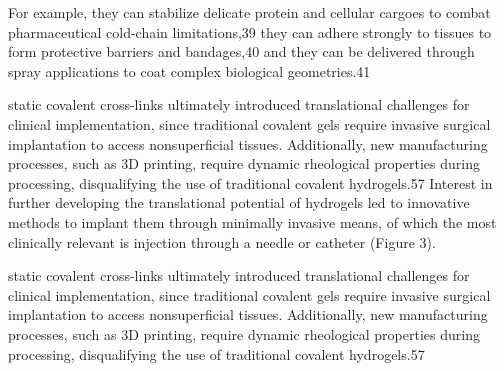 For example, they can stabilize delicate protein and cellular cargoes to combat pharmaceutical  cold-chain limitations,39 they can adhere strongly to tissues to  form protective barriers and bandages,40 and they can be delivered through spray applications to coat complex biological  geometries.41

static covalent cross-links ultimately introduced translational challenges for clinical implementation, since traditional covalent gels require invasive surgical implantation to access nonsuperficial tissues.  
Additionally, new manufacturing processes, such as 3D printing, require dynamic rheological properties during processing, disqualifying the use of traditional covalent  hydrogels.57  
Interest in further developing the translational potential of hydrogels led to innovative methods to implant them through minimally invasive means, of which the most clinically relevant is injection through a needle or catheter (Figure 3).

static covalent cross-links ultimately introduced translational challenges for clinical implementation, since traditional covalent gels require invasive surgical implantation to access nonsuperficial tissues.  
Additionally, new manufacturing processes, such as 3D printing, require dynamic rheological properties during processing, disqualifying the use of traditional covalent  hydrogels.57

\begin{comment}
These include one-step procedures like polymerization and parallel cross-linking of multifunctional monomers, as well as multiple step procedures involving synthesis of polymer molecules having reactive groups and their subsequent cross-linking, possibly also by reacting polymers with suitable cross-linking agents\citep{priyaComprehensiveReviewHydrogel2024}. 

The polymer engineer can design and synthesize polymer networks with molecular-scale control over structure such as cross-linking density and with tailored properties, such as biodegradation, mechanical strength, and chemical and biological response to stimuli\citep{priyaComprehensiveReviewHydrogel2024}.

In general, the three integral parts of the hydrogels preparation are monomer, initiator, and cross-linker. 
To control the heat of polymerization and the final hydrogels properties, diluents can be used, such as water or other aqueous solutions\citep{ahmedHydrogelPreparationCharacterization2015a}. 
Then, the hydrogel mass needs to be washed to remove impurities left from the preparation process\citep{ahmedHydrogelPreparationCharacterization2015a}. 
These include nonreacted monomer, initiators, cross-linkers, and unwanted products produced via side reactions\citep{ahmedHydrogelPreparationCharacterization2015a}.

\end{comment}


